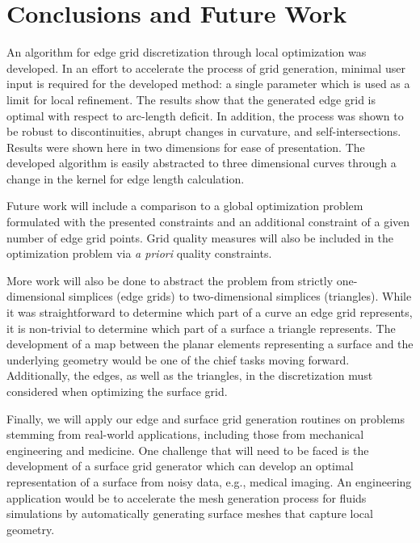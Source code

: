 \section{Conclusions and Future Work}
An algorithm for edge grid discretization through local optimization was 
developed. In an effort to accelerate the process of grid generation, 
minimal user input is required for the developed method: a single 
parameter which is used as a limit for local refinement. The results show 
that the generated edge grid is optimal with respect to arc-length 
deficit. In addition, the process was shown to be robust to 
discontinuities, abrupt changes in curvature, and self-intersections. 
Results were shown here in two dimensions for ease of presentation. The 
developed algorithm is easily abstracted to three dimensional curves
through a change in the kernel for edge length calculation.

Future work will include a comparison to a global optimization problem 
formulated with the presented constraints and an additional constraint of 
a given number of edge grid points. Grid quality measures will also be 
included in the optimization problem via {\it a priori} quality 
constraints.

More work will also be done to abstract the problem from strictly 
one-dimensional simplices (edge grids) to two-dimensional simplices 
(triangles). While it was straightforward to determine which part of a 
curve an edge grid represents, it is non-trivial to determine which part 
of a surface a triangle represents. The development of a map between the 
planar elements representing a surface and the underlying geometry would 
be one of the chief tasks moving forward. Additionally, the edges, as well 
as the triangles, in the discretization must considered when optimizing 
the surface grid.

Finally, we will apply our edge and surface grid generation routines on 
problems stemming from real-world applications, including those from 
mechanical engineering and medicine.  One challenge that will need to be 
faced is the development of a surface grid generator which can develop 
an optimal representation of a surface from noisy data, e.g., medical
imaging. An engineering application would be to accelerate the mesh generation
process for fluids simulations by automatically generating surface meshes
that capture local geometry.
